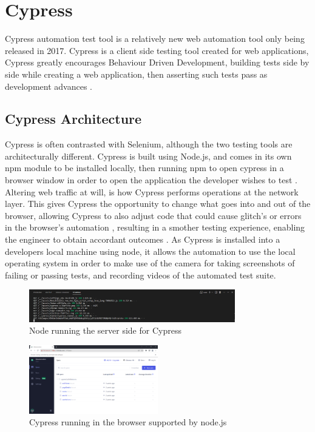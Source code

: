 \section{Cypress}
Cypress automation test tool is a relatively new web automation tool only being released in 2017. Cypress is a client side testing tool created for web applications, Cypress greatly encourages Behaviour Driven Development, building tests side by side while creating a web application, then asserting such tests pass as development advances \cite{WhyCypress}.

\subsection{Cypress Architecture}
Cypress is often contrasted with Selenium, although the two testing tools are architecturally different. Cypress is built using Node.js, and comes in its own npm module to be installed locally, then running npm to open cypress in a browser window in order to open the application the developer wishes to test \cite{taky2021automated}. Altering web traffic at will, is how Cypress performs operations at the network layer. This gives Cypress the opportunity to change what goes into and out of the browser, allowing Cypress to also adjust code that could cause glitch's or errors in the browser's automation \cite{WhyCypress}, resulting in a smother testing experience, enabling the engineer to obtain accordant outcomes \cite{pelivani2022comparative}. As Cypress is installed into a developers local machine using node, it allows the automation to use the local operating system in order to make use of the camera for taking screenshots of failing or passing tests, and recording videos of the automated test suite.
\begin{figure}[h!]
    \centering
    \includegraphics[width=0.8\textwidth]{images/CypressAndNode.png}
    \caption{Node running the server side for Cypress}
    \label{image:CypressAndNode}
\end{figure}
\begin{figure}[h!]
    \centering
    \includegraphics[width=0.5\textwidth]{images/BrowserCypress.png}
    \caption{Cypress running in the browser supported by node.js}
    \label{image:BrowserCypress}
\end{figure}

